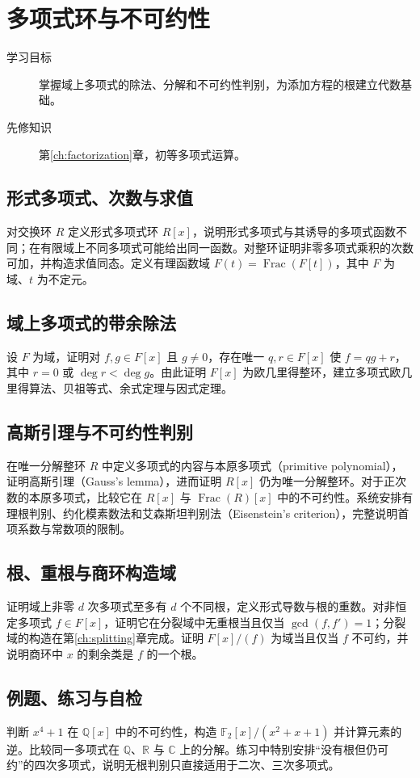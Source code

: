 \setcounter{chapter}{12} %
\chapter{多项式环与不可约性}\label{ch:polynomials}

\begin{description}
  \item[学习目标] 掌握域上多项式的除法、分解和不可约性判别，为添加方程的根建立代数基础。
  \item[先修知识] 第\ref{ch:factorization}章，初等多项式运算。
\end{description}

\section{形式多项式、次数与求值}
对交换环 $R$ 定义形式多项式环 $R[x]$，说明形式多项式与其诱导的多项式函数不同；在有限域上不同多项式可能给出同一函数。对整环证明非零多项式乘积的次数可加，并构造求值同态。定义有理函数域 $F(t)=\operatorname{Frac}(F[t])$，其中 $F$ 为域、$t$ 为不定元。

\section{域上多项式的带余除法}
设 $F$ 为域，证明对 $f,g\in F[x]$ 且 $g\ne0$，存在唯一 $q,r\in F[x]$ 使 $f=qg+r$，其中 $r=0$ 或 $\deg r<\deg g$。由此证明 $F[x]$ 为欧几里得整环，建立多项式欧几里得算法、贝祖等式、余式定理与因式定理。

\section{高斯引理与不可约性判别}
在唯一分解整环 $R$ 中定义多项式的内容与本原多项式（primitive polynomial），证明高斯引理（Gauss's lemma），进而证明 $R[x]$ 仍为唯一分解整环。对于正次数的本原多项式，比较它在 $R[x]$ 与 $\operatorname{Frac}(R)[x]$ 中的不可约性。系统安排有理根判别、约化模素数法和艾森斯坦判别法（Eisenstein's criterion），完整说明首项系数与常数项的限制。

\section{根、重根与商环构造域}
证明域上非零 $d$ 次多项式至多有 $d$ 个不同根，定义形式导数与根的重数。对非恒定多项式 $f\in F[x]$，证明它在分裂域中无重根当且仅当 $\gcd(f,f')=1$；分裂域的构造在第\ref{ch:splitting}章完成。证明 $F[x]/(f)$ 为域当且仅当 $f$ 不可约，并说明商环中 $x$ 的剩余类是 $f$ 的一个根。

\section{例题、练习与自检}
判断 $x^4+1$ 在 $\mathbb Q[x]$ 中的不可约性，构造 $\mathbb F_2[x]/(x^2+x+1)$ 并计算元素的逆。比较同一多项式在 $\mathbb Q$、$\mathbb R$ 与 $\mathbb C$ 上的分解。练习中特别安排“没有根但仍可约”的四次多项式，说明无根判别只直接适用于二次、三次多项式。

